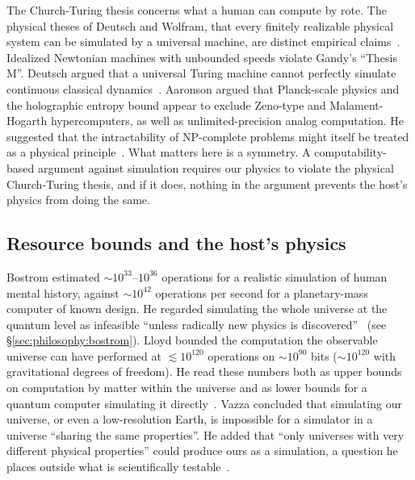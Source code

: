 The Church-Turing thesis concerns what a human can compute by rote. The
physical theses of Deutsch and Wolfram, that every finitely realizable
physical system can be simulated by a universal machine, are distinct
empirical claims~\cite{Copeland2023churchturing}. Idealized Newtonian machines
with unbounded speeds violate Gandy's ``Thesis M''. Deutsch argued that a
universal Turing machine cannot perfectly simulate continuous classical
dynamics~\cite{Copeland2023churchturing}. Aaronson argued that Planck-scale
physics and the holographic entropy bound appear to exclude Zeno-type and
Malament-Hogarth hypercomputers, as well as unlimited-precision analog
computation. He suggested that the intractability of NP-complete problems
might itself be treated as a physical principle~\cite{Aaronson2005np}. What matters here is a symmetry. A computability-based argument against
simulation requires our physics to violate the physical Church-Turing thesis,
and if it does, nothing in the argument prevents the host's physics from doing
the same.

\subsection{Resource bounds and the host's physics}
\label{sec:complexity:resources}

Bostrom estimated $\sim\!10^{33}$--$10^{36}$ operations for a realistic
simulation of human mental history, against $\sim\!10^{42}$ operations per
second for a planetary-mass computer of known design. He regarded simulating
the whole universe at the quantum level as infeasible ``unless radically new
physics is discovered''~\cite{Bostrom2003are} (see
\S\ref{sec:philosophy:bostrom}). Lloyd
bounded the computation the observable universe can have performed at
${\lesssim}10^{120}$ operations on ${\sim}10^{90}$ bits (${\sim}10^{120}$ with
gravitational degrees of freedom). He read these numbers both as upper bounds
on computation by matter within the universe and as lower bounds for a quantum
computer simulating it directly~\cite{Lloyd2002computational}. Vazza concluded
that simulating our universe, or even a low-resolution Earth, is impossible for
a simulator in a universe ``sharing the same properties''. He added that
``only universes with very different physical properties'' could produce ours
as a simulation, a question he places outside what is scientifically
testable~\cite{Vazza2025astrophysical}.

